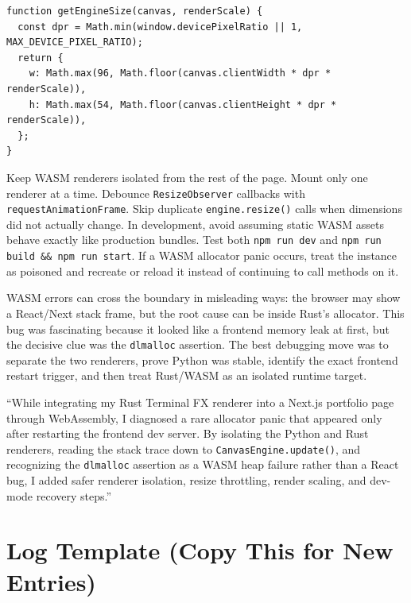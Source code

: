 \documentclass[11pt, letterpaper]{article}
\begin{document}
\begin{tcolorbox}[colback=logbg, colframe=logborder, breakable, arc=3pt, boxrule=1pt]
\begin{description}[noitemsep, leftmargin=2cm, style=nextline]
\begin{lstlisting}[style=shell]
function getEngineSize(canvas, renderScale) {
  const dpr = Math.min(window.devicePixelRatio || 1, MAX_DEVICE_PIXEL_RATIO);
  return {
    w: Math.max(96, Math.floor(canvas.clientWidth * dpr * renderScale)),
    h: Math.max(54, Math.floor(canvas.clientHeight * dpr * renderScale)),
  };
}
  \end{lstlisting}
  \item[\textbf{Prevention}] Keep WASM renderers isolated from the rest of the page. Mount only one renderer at a time. Debounce \texttt{ResizeObserver} callbacks with \texttt{requestAnimationFrame}. Skip duplicate \texttt{engine.resize()} calls when dimensions did not actually change. In development, avoid assuming static WASM assets behave exactly like production bundles. Test both \texttt{npm run dev} and \texttt{npm run build \&\& npm run start}. If a WASM allocator panic occurs, treat the instance as poisoned and recreate or reload it instead of continuing to call methods on it.
  \item[\textbf{Lessons Learned}] WASM errors can cross the boundary in misleading ways: the browser may show a React/Next stack frame, but the root cause can be inside Rust's allocator. This bug was fascinating because it looked like a frontend memory leak at first, but the decisive clue was the \texttt{dlmalloc} assertion. The best debugging move was to separate the two renderers, prove Python was stable, identify the exact frontend restart trigger, and then treat Rust/WASM as an isolated runtime target.
  \item[\textbf{STAR summary}] ``While integrating my Rust Terminal FX renderer into a Next.js portfolio page through WebAssembly, I diagnosed a rare allocator panic that appeared only after restarting the frontend dev server. By isolating the Python and Rust renderers, reading the stack trace down to \texttt{CanvasEngine.update()}, and recognizing the \texttt{dlmalloc} assertion as a WASM heap failure rather than a React bug, I added safer renderer isolation, resize throttling, render scaling, and dev-mode recovery steps.''
\end{description}
\end{tcolorbox}

\section*{Log Template (Copy This for New Entries)}
\end{document}

